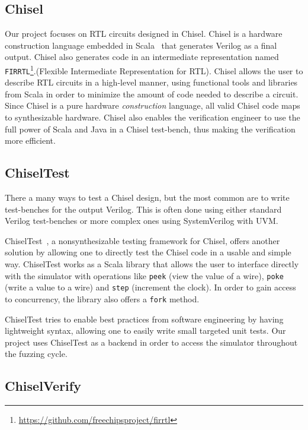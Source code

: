 \documentclass[conference]{IEEEtran}
\begin{document}
\subsection{Chisel}
Our project focuses on RTL circuits designed in Chisel.
Chisel is a hardware construction language embedded in Scala~\cite{chisel:dac2012} that generates Verilog as a final output.
Chisel also generates code in an intermediate representation named \texttt{FIRRTL}\footnote{\url{https://github.com/freechipsproject/firrtl}}.(Flexible Intermediate Representation for RTL).
Chisel allows the user to describe RTL circuits in a high-level manner, using functional tools and libraries from Scala in order to minimize the amount of code needed to describe a circuit.
Since Chisel is a pure hardware \emph{construction} language, all valid Chisel code maps to synthesizable hardware.
Chisel also enables the verification engineer to use the full power of Scala and Java in a Chisel test-bench, thus making the verification more efficient.

\subsection{ChiselTest}
 
 There a many ways to test a Chisel design, but the most common are to write test-benches for the output Verilog.
 This is often done using either standard Verilog test-benches or more complex ones using SystemVerilog with UVM.
 
ChiselTest~\cite{chisel:tester2}, a nonsynthesizable testing framework for Chisel, offers another solution by allowing one to directly test the Chisel code in a usable and simple way.
ChiselTest works as a Scala library that allows the user to interface directly with the simulator with operations like \texttt{peek} (view the value of a wire), \texttt{poke} (write a value to a wire) and \texttt{step} (increment the clock).
In order to gain access to concurrency, the library also offers a \texttt{fork} method.

ChiselTest tries to enable best practices from software engineering by having lightweight syntax, allowing one to easily write small targeted unit tests.
Our project uses ChiselTest as a backend in order to access the simulator throughout the fuzzing cycle.

\subsection{ChiselVerify}
\end{document}
